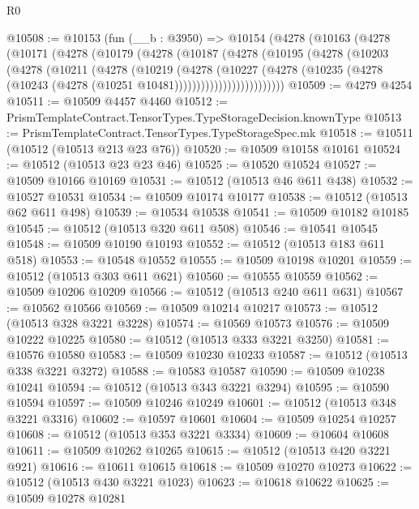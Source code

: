 \begin{lexlean}{R0}
\begin{coremodule}
@10508 := @10153
    (fun (__b : @3950) =>
    @10154
      (@4278
        (@10163
          (@4278
            (@10171
              (@4278
                (@10179
                  (@4278
                    (@10187
                      (@4278
                        (@10195
                          (@4278
                            (@10203
                              (@4278
                                (@10211
                                  (@4278
                                    (@10219
                                      (@4278
                                        (@10227
                                          (@4278
                                            (@10235
                                              (@4278
                                                (@10243
                                                  (@4278 (@10251 @10481)))))))))))))))))))))))))
@10509 := @4279 @4254
@10511 := @10509 @4457 @4460
@10512 := PrismTemplateContract.TensorTypes.TypeStorageDecision.knownType
@10513 := PrismTemplateContract.TensorTypes.TypeStorageSpec.mk
@10518 := @10511 (@10512 (@10513 @213 @23 @76))
@10520 := @10509 @10158 @10161
@10524 := @10512 (@10513 @23 @23 @46)
@10525 := @10520 @10524
@10527 := @10509 @10166 @10169
@10531 := @10512 (@10513 @46 @611 @438)
@10532 := @10527 @10531
@10534 := @10509 @10174 @10177
@10538 := @10512 (@10513 @62 @611 @498)
@10539 := @10534 @10538
@10541 := @10509 @10182 @10185
@10545 := @10512 (@10513 @320 @611 @508)
@10546 := @10541 @10545
@10548 := @10509 @10190 @10193
@10552 := @10512 (@10513 @183 @611 @518)
@10553 := @10548 @10552
@10555 := @10509 @10198 @10201
@10559 := @10512 (@10513 @303 @611 @621)
@10560 := @10555 @10559
@10562 := @10509 @10206 @10209
@10566 := @10512 (@10513 @240 @611 @631)
@10567 := @10562 @10566
@10569 := @10509 @10214 @10217
@10573 := @10512 (@10513 @328 @3221 @3228)
@10574 := @10569 @10573
@10576 := @10509 @10222 @10225
@10580 := @10512 (@10513 @333 @3221 @3250)
@10581 := @10576 @10580
@10583 := @10509 @10230 @10233
@10587 := @10512 (@10513 @338 @3221 @3272)
@10588 := @10583 @10587
@10590 := @10509 @10238 @10241
@10594 := @10512 (@10513 @343 @3221 @3294)
@10595 := @10590 @10594
@10597 := @10509 @10246 @10249
@10601 := @10512 (@10513 @348 @3221 @3316)
@10602 := @10597 @10601
@10604 := @10509 @10254 @10257
@10608 := @10512 (@10513 @353 @3221 @3334)
@10609 := @10604 @10608
@10611 := @10509 @10262 @10265
@10615 := @10512 (@10513 @420 @3221 @921)
@10616 := @10611 @10615
@10618 := @10509 @10270 @10273
@10622 := @10512 (@10513 @430 @3221 @1023)
@10623 := @10618 @10622
@10625 := @10509 @10278 @10281

\end{coremodule}
\end{lexlean}
